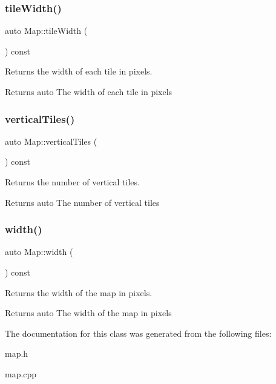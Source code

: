 \subsubsection{\texorpdfstring{tileWidth()}{tileWidth()}}
{\footnotesize\ttfamily auto Map\+::tile\+Width (\begin{DoxyParamCaption}{ }\end{DoxyParamCaption}) const\hspace{0.3cm}{\ttfamily [inline]}}



Returns the width of each tile in pixels. 

\begin{DoxyReturn}{Returns}
auto The width of each tile in pixels 
\end{DoxyReturn}
\mbox{\label{classMap_a144dfbc2a51f8337b02831fa77b1d51f}} 
\subsubsection{\texorpdfstring{verticalTiles()}{verticalTiles()}}
{\footnotesize\ttfamily auto Map\+::vertical\+Tiles (\begin{DoxyParamCaption}{ }\end{DoxyParamCaption}) const\hspace{0.3cm}{\ttfamily [inline]}}



Returns the number of vertical tiles. 

\begin{DoxyReturn}{Returns}
auto The number of vertical tiles 
\end{DoxyReturn}
\mbox{\label{classMap_a22c34c8f3c83d69a4ceceefbaf3eec07}} 
\subsubsection{\texorpdfstring{width()}{width()}}
{\footnotesize\ttfamily auto Map\+::width (\begin{DoxyParamCaption}{ }\end{DoxyParamCaption}) const\hspace{0.3cm}{\ttfamily [inline]}}



Returns the width of the map in pixels. 

\begin{DoxyReturn}{Returns}
auto The width of the map in pixels 
\end{DoxyReturn}


The documentation for this class was generated from the following files\+:\begin{DoxyCompactItemize}
\item 
map.\+h\item 
map.\+cpp\end{DoxyCompactItemize}
